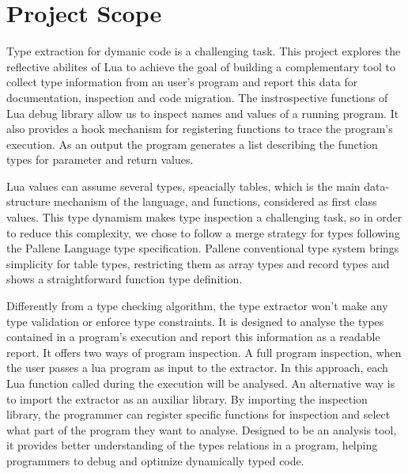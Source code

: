 
\chapter{Project Scope}
\label{cha:Project Scope}
Type extraction for dymanic code is a challenging task. This project explores the reflective abilites of Lua to achieve the goal of building a complementary tool to collect type information from an user's program and report this data for documentation, inspection and code migration. The instrospective functions of Lua debug library allow us to inspect names and values of a running program. It also provides a hook mechanism for registering functions to trace the program's execution. As an output the program generates a list describing the function types for parameter and return values.
\par
Lua values can assume several types, speacially tables, which is the main data-structure mechanism of the language, and functions, considered as first class values. This type dynamism makes type inspection a challenging task, so in order to reduce this complexity, we chose to follow a merge strategy for types following the Pallene Language type specification. Pallene conventional type system brings simplicity for table types, restricting them as array types and record types and shows a straightforward function type definition. 
\par
Differently from a type checking algorithm, the type extractor won't make any type validation or enforce type constraints. It is designed to analyse the types contained in a program's execution and report this information as a readable report. It offers two ways of program inspection. A full program inspection, when the user passes a lua program as input to the extractor. In this approach, each Lua function called during the execution will be analysed. An alternative way is to import the extractor as an auxiliar library. By importing the inspection library, the programmer can register specific functions for inspection and select what part of the program they want to analyse. Designed to be an analysis tool, it provides better understanding of the types relations in a program, helping programmers to debug and optimize dynamically typed code.



